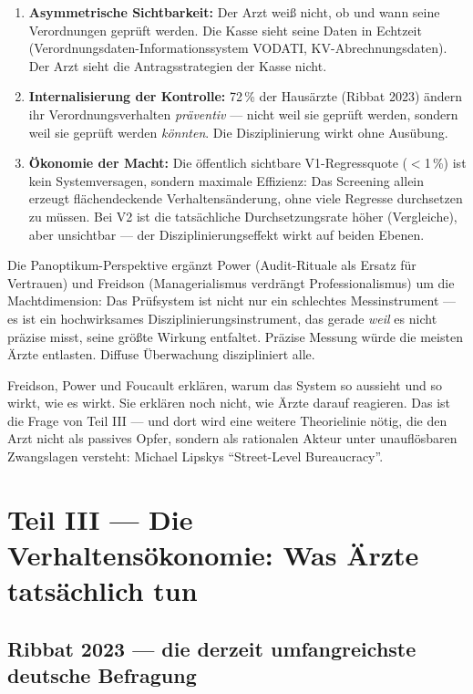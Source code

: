 \documentclass{umbruch-position}
\begin{document}
\begin{enumerate}[nosep]
  \item \textbf{Asymmetrische Sichtbarkeit:} Der Arzt weiß nicht, ob und wann seine Verordnungen geprüft werden. Die Kasse sieht seine Daten in Echtzeit (Verordnungsdaten-Informationssystem VODATI, KV-Abrechnungsdaten). Der Arzt sieht die Antragsstrategien der Kasse nicht.
  \item \textbf{Internalisierung der Kontrolle:} 72\,\% der Hausärzte (Ribbat 2023) ändern ihr Verordnungsverhalten \textit{präventiv} --- nicht weil sie geprüft werden, sondern weil sie geprüft werden \textit{könnten}. Die Disziplinierung wirkt ohne Ausübung.
  \item \textbf{Ökonomie der Macht:} Die öffentlich sichtbare V1-Regressquote ($<$1\,\%) ist kein Systemversagen, sondern maximale Effizienz: Das Screening allein erzeugt flächendeckende Verhaltensänderung, ohne viele Regresse durchsetzen zu müssen. Bei V2 ist die tatsächliche Durchsetzungsrate höher (Vergleiche), aber unsichtbar --- der Disziplinierungseffekt wirkt auf beiden Ebenen.
\end{enumerate}

\noindent Die Panoptikum-Perspektive ergänzt Power (Audit-Rituale als Ersatz für Vertrauen) und Freidson (Managerialismus verdrängt Professionalismus) um die Machtdimension: Das Prüfsystem ist nicht nur ein schlechtes Messinstrument --- es ist ein hochwirksames Disziplinierungsinstrument, das gerade \textit{weil} es nicht präzise misst, seine größte Wirkung entfaltet. Präzise Messung würde die meisten Ärzte entlasten. Diffuse Überwachung diszipliniert alle.

Freidson, Power und Foucault erklären, warum das System so aussieht und so wirkt, wie es wirkt. Sie erklären noch nicht, wie Ärzte darauf reagieren. Das ist die Frage von Teil III --- und dort wird eine weitere Theorielinie nötig, die den Arzt nicht als passives Opfer, sondern als rationalen Akteur unter unauflösbaren Zwangslagen versteht: Michael Lipskys ``Street-Level Bureaucracy''.


\section{Teil III --- Die Verhaltensökonomie: Was Ärzte tatsächlich tun}

\subsection{Ribbat 2023 --- die derzeit umfangreichste deutsche Befragung}
\end{document}
